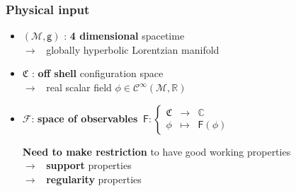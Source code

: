 \documentclass[9pt]{beamer}
\newcommand{\Ccal}{\mathcal{C}}
\newcommand{\Fcal}{\mathcal{F}}
\newcommand{\Mcal}{\mathcal{M}}
\newcommand{\Cbb}{\mathbb{C}}
\newcommand{\Rbb}{\mathbb{R}}
\newcommand{\Crak}{\mathfrak{C}}
\newcommand{\Fsf}{\mathsf{F}}
\newcommand{\gsf}{\mathsf{g}}
\begin{document}

\begin{frame}

\frametitle{Physical input}
  
\begin{itemize}
  
\item $(\Mcal,\gsf)$ : \textbf{4 dimensional} spacetime \\[2pt]
\qquad $\to$ \ globally hyperbolic Lorentzian manifold
    
\item $\Crak$ : \textbf{off shell} configuration space \\[2pt] 
\qquad $\to$ \ real scalar field $\phi \in \Ccal^\infty(\Mcal,\Rbb)$
        
\item $\Fcal$: \textbf{space of observables}
$
\ \Fsf : \left\{
\begin{array}{ccc}
\Crak & \to & \Cbb \\
\phi & \mapsto & \Fsf(\phi)
\end{array}
\right.
$
   
\vspace*{16pt}
   
\textbf{Need to make restriction} to have good working properties \\[5pt]

\qquad $\to$ \ \textbf{support} properties \\[3pt]
 
\qquad $\to$ \ \textbf{regularity} properties

\end{itemize}

\end{frame}  

\end{document}
